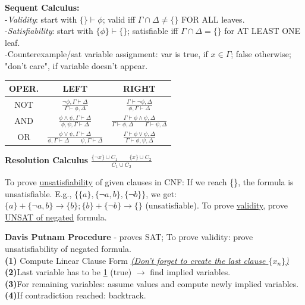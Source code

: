 \documentclass{article}
\begin{document}
\begin{multicols}{4}
\textbf{Sequent Calculus:}\\
-\textit{Validity}: start with $\{\} \vdash {\phi}$;  valid iff $\Gamma \cap \Delta \neq \{\}$ FOR ALL leaves.\\
-\textit{Satisfiability}: start with $\{\phi\} \vdash \{\}$; satisfiable iff $\Gamma \cap \Delta = \{\}$ for AT LEAST ONE leaf.\\
-Counterexample/sat variable assignment: var is true, if $x \in \Gamma$; false otherwise; "don't care", if variable doesn't appear.\\
\begin{tabular}{|c|c|c|}
\hline
OPER. & LEFT & RIGHT \\ \hline
NOT & $\frac{\neg \phi,\Gamma \vdash \Delta}{\Gamma \vdash \phi, \Delta}$ & $\frac{\Gamma \vdash \neg \phi, \Delta}{\phi, \Gamma \vdash \Delta}$ \\ \hline
AND & $\frac{\phi \wedge \psi,\Gamma \vdash \Delta}{\phi, \psi,\Gamma \vdash \Delta}$ & $\frac{\Gamma \vdash \phi \wedge \psi, \Delta}{\Gamma \vdash \phi,\Delta \qquad \Gamma \vdash \psi,\Delta}$\\ \hline
OR & $\frac{\phi \vee \psi,\Gamma \vdash \Delta}{\phi,\Gamma \vdash \Delta \qquad \psi,\Gamma \vdash \Delta}$ & $\frac{\Gamma \vdash \phi \vee \psi, \Delta}{\Gamma \vdash \phi, \psi, \Delta}$ \\ \hline
\end{tabular}
\textbf{Resolution Calculus} $\frac{\{\neg x \} \cup C_1 \qquad \{x \} \cup C_2 }{C_1 \cup C_2}$

To prove \underline{unsatisfiability} of given clauses in CNF: If we reach \{\}, the formula is unsatisfiable. 
E.g., $\{\{a\}, \{\neg a,b\}, \{\neg b\}\}$, we get: $\{a\} + \{ \neg a,b\} \rightarrow \{b\}; \{b\} + \{\neg b\}\rightarrow\{\} $ (unsatisfiable).
To prove \underline{validity}, prove \underline{UNSAT of negated} formula.

\textbf{Davis Putnam Procedure} - proves SAT; To prove validity: prove unsatisfiability of negated formula. \\
\textbf{(1)} Compute Linear Clause Form \underline{\textit{(Don't forget to create the last clause $\{x_n\}$)}} \\
\textbf{(2)}Last variable has to be \underline{1} (true) $\rightarrow$ find implied variables. \\
\textbf{(3)}For remaining variables: assume values and compute newly implied variables. \\
\textbf{(4)}If contradiction reached: backtrack.


\end{multicols}
\end{document}
